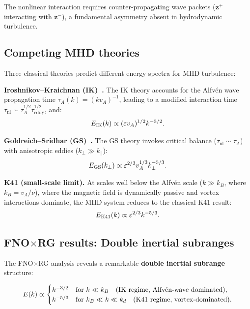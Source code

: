 The nonlinear interaction requires counter-propagating wave packets ($\mathbf{z}^+$ interacting with $\mathbf{z}^-$), a fundamental asymmetry absent in hydrodynamic turbulence.

\subsection{Competing MHD theories}

Three classical theories predict different energy spectra for MHD turbulence:

\textbf{Iroshnikov--Kraichnan (IK)~\cite{iroshnikov1964turbulence,kraichnan1965inertial}.} The IK theory accounts for the Alfv\'en wave propagation time $\tau_A(k) = (k v_A)^{-1}$, leading to a modified interaction time $\tau_{\mathrm{nl}} \sim \tau_A^{1/2}\tau_{\mathrm{eddy}}^{1/2}$, and:
\begin{equation}\label{eq:ik_spectrum}
E_{\text{IK}}(k) \propto (\varepsilon v_A)^{1/2} k^{-3/2}.
\end{equation}

\textbf{Goldreich--Sridhar (GS)~\cite{goldreich1995toward}.} The GS theory invokes critical balance ($\tau_{\mathrm{nl}} \sim \tau_A$) with anisotropic eddies ($k_\perp \gg k_\parallel$):
\begin{equation}\label{eq:gs_spectrum}
E_{\text{GS}}(k_\perp) \propto \varepsilon^{2/3}v_A^{1/3}k_\perp^{-5/3}.
\end{equation}

\textbf{K41 (small-scale limit).} At scales well below the Alfv\'en scale ($k \gg k_B$, where $k_B = v_A/\nu$), where the magnetic field is dynamically passive and vortex interactions dominate, the MHD system reduces to the classical K41 result:
\begin{equation}\label{eq:k41_mhd}
E_{\text{K41}}(k) \propto \varepsilon^{2/3}k^{-5/3}.
\end{equation}

\subsection{\texorpdfstring{FNO$\times$}{FNO x}RG results: Double inertial subranges}

The FNO$\times$RG analysis reveals a remarkable \textbf{double inertial subrange} structure:

{\footnotesize
\begin{equation} \label{eq:mhd_double}
E(k) \propto \begin{cases}
k^{-3/2} & \text{for } k \ll k_B \quad (\text{IK} \text{ regime, Alfv\'en-wave dominated}), \\
k^{-5/3} & \text{for } k_B \ll k \ll k_d \quad (\text{K41} \text{ regime, vortex-dominated}).
\end{cases}
\end{equation}
}

